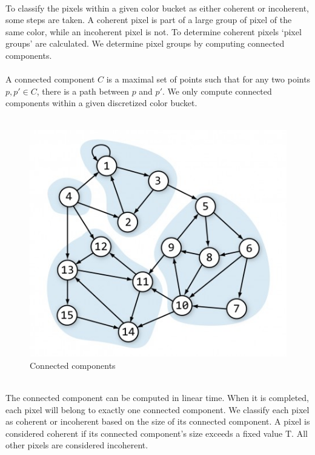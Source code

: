 \documentclass[pstricks,10pt]{report}
\begin{document}
\\
To classify the pixels within a given color bucket as either coherent or incoherent, some steps are taken. A coherent pixel is part of a large group of pixel of the same color, while an incoherent pixel is not. To determine coherent pixels ‘pixel groups’ are calculated. We determine pixel groups by computing connected components.\\
\\
A connected component $C$ is a maximal set of points such that for any two points $p,p' \in C$, there is a path between $p$ and $p'$. We only compute connected components within a given discretized color bucket.\\
\\
\begin{figure}[!h]
\centering
        \includegraphics[width=.4\linewidth]{connected.jpg}
    \caption{Connected components}
    \label{fig:connected}
\end{figure}
\\
The connected component can be computed in linear time. When it is completed, each pixel will belong to exactly one connected component. We classify each pixel as coherent or incoherent based on the size of its connected component. A pixel is considered coherent if its connected component’s size exceeds a fixed value $\mathrm{T}$. All other pixels are considered incoherent.\\
\end{document}
